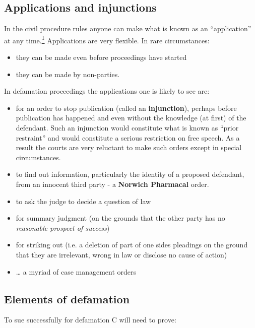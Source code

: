 \documentclass[]{article}
\begin{document}
\subsection{Applications and injunctions}

{In the civil procedure rules anyone can make what is known as an
``application'' at any
time}{{.\hyperref[sdfootnote1sym]{\textsuperscript{1}} Applications are
very flexible. In rare circumstances:}}

\begin{itemize}
\item
  they can be made even before proceedings have started
\item
  they can be made by non-parties.
\end{itemize}

In defamation proceedings the applications one is likely to see are:

\begin{itemize}
\item for an order to stop publication (called an {\bf injunction}), perhaps before publication has happened  and even without the knowledge (at first) of the defendant. Such an injunction would constitute what is known as ``prior restraint'' and would constitute a serious restriction on free speech. As a result the courts are very reluctant to make such orders except in special circumstances.
\item {{to find out information, particularly the identity of a proposed
  defendant, from an innocent third party - a }}{\textbf{Norwich
  Pharmacal} }{{order.}}
\item
  to ask the judge to decide a question of law
\item
  {{for summary judgment (on the grounds that the other party has no
  }}\emph{{reasonable prospect of success}}{{)}}
\item
  for striking out (i.e. a deletion of part of one sides pleadings on
  the ground that they are irrelevant, wrong in law or disclose no cause
  of action)
\item
  \ldots{} a myriad of case management orders
\end{itemize}


\subsection{Elements of defamation}

To sue successfully for defamation C will need to prove:
\end{document}
